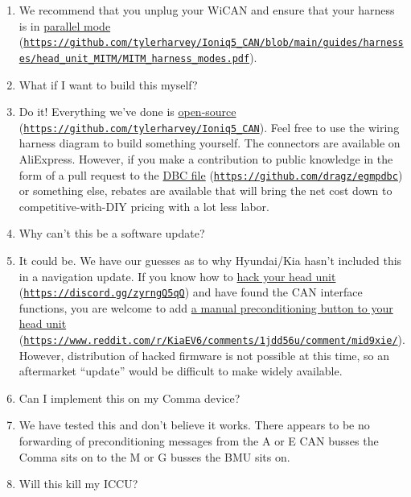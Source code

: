 \documentclass[superscriptaddress,onecolumn,floatfix]{revtex4-2}
\begin{document}
\begin{enumerate}
  \item[A:] We recommend that you unplug your WiCAN and ensure that your harness is in \href{https://github.com/tylerharvey/Ioniq5_CAN/blob/main/guides/harnesses/head_unit_MITM/MITM_harness_modes.pdf}{parallel mode} (\href{https://github.com/tylerharvey/Ioniq5_CAN/blob/main/guides/harnesses/head_unit_MITM/MITM_harness_modes.pdf}{\nolinkurl{https://github.com/tylerharvey/Ioniq5_CAN/blob/main/guides/harnesses/head_unit_MITM/MITM_harness_modes.pdf}}).
  \item[Q:] What if I want to build this myself?
  \item[A:] Do it! Everything we've done is \href{https://github.com/tylerharvey/Ioniq5_CAN}{open-source} (\href{https://github.com/tylerharvey/Ioniq5_CAN}{\nolinkurl{https://github.com/tylerharvey/Ioniq5_CAN}}). Feel free to use the wiring harness diagram to build something yourself. The connectors are available on AliExpress. However, if you make a contribution to public knowledge in the form of a pull request to the \href{https://github.com/dragz/egmpdbc}{DBC file} (\href{https://github.com/dragz/egmpdbc}{\nolinkurl{https://github.com/dragz/egmpdbc}}) or something else, rebates are available that will bring the net cost down to competitive-with-DIY pricing with a lot less labor.
  \item[Q:] Why can't this be a software update?
  \item[A:] It could be. We have our guesses as to why Hyundai/Kia hasn't included this in a navigation update. If you  know how to \href{https://discord.gg/zyrngQ5qQ}{hack your head unit} (\href{https://discord.gg/zyrngQ5qQ}{\nolinkurl{https://discord.gg/zyrngQ5qQ}}) and have found the CAN interface functions, you are welcome to add \href{https://www.reddit.com/r/KiaEV6/comments/1jdd56u/comment/mid9xie/}{a manual preconditioning button to your head unit} (\href{https://www.reddit.com/r/KiaEV6/comments/1jdd56u/comment/mid9xie/}{\nolinkurl{https://www.reddit.com/r/KiaEV6/comments/1jdd56u/comment/mid9xie/}}). However, distribution of hacked firmware is not possible at this time, so an aftermarket ``update'' would be difficult to make widely available.
  \item[Q:] Can I implement this on my Comma device?
  \item[A:] We have tested this and don't believe it works. There appears to be no forwarding of preconditioning messages from the A or E CAN busses the Comma sits on to the M or G busses the BMU sits on.
  \item[Q:] Will this kill my ICCU?

\end{enumerate}
\end{document}

